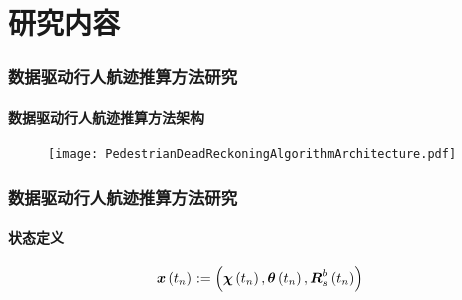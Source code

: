 

\section{研究内容}

\begin{frame}

	\frametitle{数据驱动行人航迹推算方法研究}	
	\framesubtitle{数据驱动行人航迹推算方法架构}
	
	\begin{figure}
	\centering
	    \texttt{[image: PedestrianDeadReckoningAlgorithmArchitecture.pdf]}
	\end{figure}	
 
\end{frame}

\begin{frame}
	\frametitle{数据驱动行人航迹推算方法研究}	
	\framesubtitle{状态定义}	
	\begin{equation*}
	   	\vb*{x}\left(t_n\right) := \left( \vb*{\chi}\left(t_n\right), \vb*{\theta}\left(t_n\right), \vb*{R}_s^b\left(t_n\right)\right) 
	   	\label{eq:InvariantExtendedKalmanFilterPedestrianState}
	\end{equation*} 
\end{frame}

